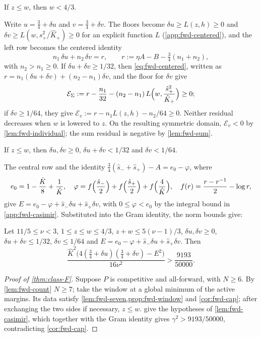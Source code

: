 \begin{lemma}\label{lem:fwd-neighbour}
If $z\le w$, then $w<4/3$.
\end{lemma}

 Write $u=\frac34+\delta u$ and
$v=\frac34+\delta v$. The floors become $\delta u\ge L(z,h)\ge0$ and
$\delta v\ge L(w,\hat s_+^2/\hat K_+)\ge0$ for an explicit function $L$ (\cref{app:fwd-centered}),
and the left row becomes the centered identity
\begin{equation}\label{eq:fwd-centered}
n_1\,\delta u+n_2\,\delta v=r,\qquad r:=\eta A-B-\tfrac34(n_1+n_2),
\end{equation}
with $n_2>n_1\ge0$. If $\delta u+\delta v\ge1/32$, then \eqref{eq:fwd-centered}, written as
$r=n_1(\delta u+\delta v)+(n_2-n_1)\delta v$, and the floor for $\delta v$ give
\[
\mathcal E_\Sigma:=r-\frac{n_1}{32}-(n_2-n_1)\,L\Bigl(w,\frac{\hat s_+^2}{\hat K_+}\Bigr)\ge0;
\]
if $\delta v\ge1/64$, they give $\mathcal E_v:=r-n_1L(z,h)-n_2/64\ge0$. Neither residual decreases
when $w$ is lowered to $z$. On the resulting symmetric domain,
$\mathcal E_v<0$ by \cref{lem:fwd-individual}; the sum residual is negative by \cref{lem:fwd-sum}.

\begin{lemma}\label{lem:fwd-norms}
If $z\le w$, then $\delta u,\delta v\ge0$, $\delta u+\delta v<1/32$ and $\delta v<1/64$.
\end{lemma}

 The central row and the identity
$\frac34(\hat s_-+\hat s_+)-A=e_0-\varphi$, where
\[
e_0=1-\frac{\hat K}8+\frac1{\hat K},\quad
\varphi=f\Bigl(\frac{\hat s_-}2\Bigr)+f\Bigl(\frac{\hat s_+}2\Bigr)+f\Bigl(\frac4{\hat K}\Bigr),
\quad f(r)=\frac{r-r^{-1}}2-\log r,
\]
give $E=e_0-\varphi+\hat s_-\delta u+\hat s_+\delta v$, with $0\le\varphi<e_0$ by the
integral bound in \cref{app:fwd-casimir}. Substituted into the Gram identity, the norm bounds give:

\begin{lemma}\label{lem:fwd-casimir}
Let $11/5\le\nu<3$, $1\le z\le w\le4/3$, $z+w\le5(\nu-1)/3$, $\delta u,\delta v\ge0$,
$\delta u+\delta v\le1/32$, $\delta v\le1/64$ and
$E=e_0-\varphi+\hat s_-\delta u+\hat s_+\delta v$. Then
\[
\frac{\hat K^2\bigl(4(\frac34+\delta u)(\frac34+\delta v)-E^2\bigr)}{16\nu^2}>\frac{9193}{50000}.
\]
\end{lemma}

\begin{proof}[Proof of \cref{thm:class-F}]
Suppose $P$ is competitive and all-forward, with $N\ge6$. By \cref{lem:fwd-count} $N\ge7$; take the
window at a global minimum of the active margins. Its data satisfy
\cref{lem:fwd-seven,prop:fwd-window} and \cref{cor:fwd-cap}; after exchanging the two sides if
necessary, $z\le w$.  give
the hypotheses of \cref{lem:fwd-casimir}, which together with the Gram identity gives
$\gamma^2>9193/50000$, contradicting \cref{cor:fwd-cap}.
\end{proof}

